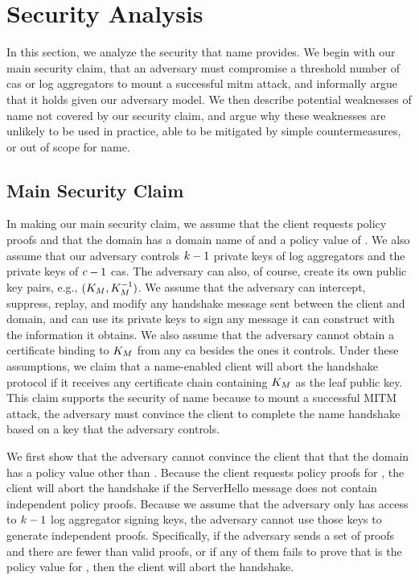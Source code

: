 \section{Security Analysis}
\label{sec:analysis}

In this section, we analyze the security that \ac{name} provides. We begin with
our main security claim, that an adversary must compromise a threshold number
of \acp{ca} or log aggregators to mount a successful \ac{mitm} attack, and
informally argue that it holds given our adversary model. We then describe
potential weaknesses of \ac{name} not covered by our security claim, and argue
why these weaknesses are unlikely to be used in practice, able to be mitigated
by simple countermeasures, or out of scope for \ac{name}.

\subsection{Main Security Claim}
\label{sec:analysis:informal}

In making our main security claim, we assume that the client requests \numlas
policy proofs and that the domain has a domain name of \domain and a policy
value of \policy. 
We also assume that our adversary controls $k - 1$
private keys of log aggregators and the private keys of $c - 1$ \acp{ca}.
The adversary can also, of course, create its own public key pairs, e.g., 
$(K_M, K_M^{-1})$.
We assume that the adversary
can intercept, suppress, replay, and modify any handshake message sent between
the client and domain, and can use its private keys to 
sign any message it can construct with the
information it obtains. We also assume that the adversary
cannot obtain a certificate binding \domain to $K_M$ from any \ac{ca}
besides the ones it controls. Under these assumptions, we claim that a \ac{name}-enabled client
will abort the handshake protocol if it receives any certificate chain
containing $K_M$ as the leaf public key. This claim 
supports the security of \ac{name} because to mount a successful MITM attack,
the adversary must convince the client to complete the \ac{name} handshake
based on a key that the adversary controls.

We first show that the adversary cannot convince the client that that the domain
has a policy value other than \policy. Because the client requests \numlas
policy proofs for \domain, the client will abort the handshake if the 
ServerHello message does not contain \numlas independent policy
proofs. Because we assume that the adversary only has access to $k - 1$
log aggregator signing keys, the adversary cannot use those keys to
generate \numlas independent proofs. Specifically, if the adversary sends a set
of proofs and there are fewer than \numlas valid proofs, or if any of them fails
to prove that \policy is the policy value for \domain, then the client will
abort the handshake.

